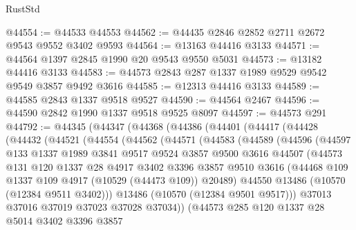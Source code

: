 \begin{lexlean}{RustStd}
\begin{coremodule}
@44554 := @44533 @44553
@44562 := @44435 @2846 @2852 @2711 @2672 @9543 @9552 @3402 @9593
@44564 := @13163 @44416 @3133
@44571 := @44564 @1397 @2845 @1990 @20 @9543 @9550 @5031
@44573 := @13182 @44416 @3133
@44583 := @44573 @2843 @287 @1337 @1989 @9529 @9542 @9549 @3857 @9492 @3616
@44585 := @12313 @44416 @3133
@44589 := @44585 @2843 @1337 @9518 @9527
@44590 := @44564 @2467
@44596 := @44590 @2842 @1990 @1337 @9518 @9525 @8097
@44597 := @44573 @291
@44792 := @44345
    (@44347
      (@44368
        (@44386
          (@44401
            (@44417
              (@44428
                (@44432
                  (@44521
                    (@44554
                      (@44562
                        (@44571
                          (@44583
                            (@44589
                              (@44596
                                (@44597
                                  @133
                                  @1337
                                  @1989
                                  @3841
                                  @9517
                                  @9524
                                  @3857
                                  @9500
                                  @3616
                                  @44507
                                  (@44573
                                    @131
                                    @120
                                    @1337
                                    @28
                                    @4917
                                    @3402
                                    @3396
                                    @3857
                                    @9510
                                    @3616
                                    (@44468 @109 @1337 @109 @4917 (@10529 (@44473 @109)) @20489)
                                    @44550
                                    @13486
                                    (@10570 (@12384 @9511 @3402)))
                                  @13486
                                  (@10570 (@12384 @9501 @9517)))
                                @37013
                                @37016
                                @37019
                                @37023
                                @37028
                                @37034))
                            (@44573
                              @285
                              @120
                              @1337
                              @28
                              @5014
                              @3402
                              @3396
                              @3857

\end{coremodule}
\end{lexlean}
